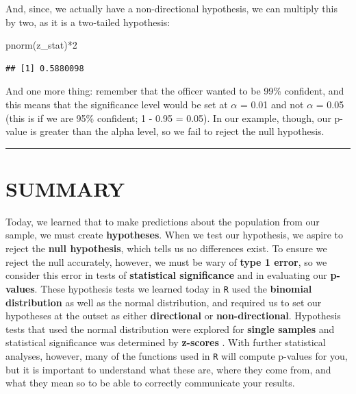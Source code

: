 \documentclass[
]{book}
\newenvironment{Shaded}{\begin{snugshade}}{\end{snugshade}}
\newcommand{\DecValTok}[1]{\textcolor[rgb]{0.00,0.00,0.81}{#1}}
\newcommand{\FunctionTok}[1]{\textcolor[rgb]{0.00,0.00,0.00}{#1}}
\newcommand{\NormalTok}[1]{#1}
\newcommand{\SpecialCharTok}[1]{\textcolor[rgb]{0.00,0.00,0.00}{#1}}
\begin{document}
And, since, we actually have a non-directional hypothesis, we can multiply this by two, as it is a two-tailed hypothesis:

\begin{Shaded}
\begin{Highlighting}[]
\FunctionTok{pnorm}\NormalTok{(z\_stat)}\SpecialCharTok{*}\DecValTok{2}
\end{Highlighting}
\end{Shaded}

\begin{verbatim}
## [1] 0.5880098
\end{verbatim}

And one more thing: remember that the officer wanted to be 99\% confident, and this means that the significance level would be set at \(\alpha\) = 0.01 and not \(\alpha\) = 0.05 (this is if we are 95\% confident; 1 - 0.95 = 0.05). In our example, though, our p-value is greater than the alpha level, so we fail to reject the null hypothesis.

\begin{center}\rule{0.5\linewidth}{0.5pt}\end{center}

\hypertarget{summary-5}{%
\section{SUMMARY}\label{summary-5}}

Today, we learned that to make predictions about the population from our sample, we must create \textbf{hypotheses}. When we test our hypothesis, we aspire to reject the \textbf{null hypothesis}, which tells us no differences exist. To ensure we reject the null accurately, however, we must be wary of \textbf{type 1 error}, so we consider this error in tests of \textbf{statistical significance} and in evaluating our \textbf{p-values}. These hypothesis tests we learned today in \texttt{R} used the \textbf{binomial distribution} as well as the normal distribution, and required us to set our hypotheses at the outset as either \textbf{directional} or \textbf{non-directional}. Hypothesis tests that used the normal distribution were explored for \textbf{single samples} and statistical significance was determined by \textbf{z-scores} . With further statistical analyses, however, many of the functions used in \texttt{R} will compute p-values for you, but it is important to understand what these are, where they come from, and what they mean so to be able to correctly communicate your results.
\end{document}
